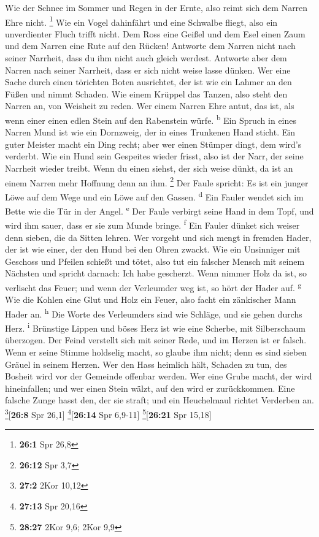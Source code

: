 Wie der Schnee im Sommer und Regen in der Ernte, also
reimt sich dem Narren Ehre nicht. \footnote{\textbf{26:1} Spr 26,8}
 Wie ein Vogel dahinfährt und eine Schwalbe fliegt, also
ein unverdienter Fluch trifft nicht.  Dem Ross eine Geißel
und dem Esel einen Zaum und dem Narren eine Rute auf den Rücken!
 Antworte dem Narren nicht nach seiner Narrheit, dass du
ihm nicht auch gleich werdest.  Antworte aber dem Narren
nach seiner Narrheit, dass er sich nicht weise lasse dünken.
 Wer eine Sache durch einen törichten Boten ausrichtet,
der ist wie ein Lahmer an den Füßen und nimmt Schaden. 
Wie einem Krüppel das Tanzen, also steht den Narren an, von Weisheit zu
reden.  Wer einem Narren Ehre antut, das ist, als wenn
einer einen edlen Stein auf den Rabenstein würfe. \textsuperscript{b}
 Ein Spruch in eines Narren Mund ist wie ein Dornzweig,
der in eines Trunkenen Hand sticht.  Ein guter Meister
macht ein Ding recht; aber wer einen Stümper dingt, dem wird's verderbt.
 Wie ein Hund sein Gespeites wieder frisst, also ist der
Narr, der seine Narrheit wieder treibt.  Wenn du einen
siehst, der sich weise dünkt, da ist an einem Narren mehr Hoffnung denn
an ihm. \footnote{\textbf{26:12} Spr 3,7}  Der Faule
spricht: Es ist ein junger Löwe auf dem Wege und ein Löwe auf den
Gassen. \textsuperscript{d}  Ein Fauler wendet sich im
Bette wie die Tür in der Angel. \textsuperscript{e}  Der
Faule verbirgt seine Hand in dem Topf, und wird ihm sauer, dass er sie
zum Munde bringe. \textsuperscript{f}  Ein Fauler dünket
sich weiser denn sieben, die da Sitten lehren.  Wer
vorgeht und sich mengt in fremden Hader, der ist wie einer, der den Hund
bei den Ohren zwackt.  Wie ein Unsinniger mit Geschoss
und Pfeilen schießt und tötet,  also tut ein falscher
Mensch mit seinem Nächsten und spricht darnach: Ich habe gescherzt.
 Wenn nimmer Holz da ist, so verlischt das Feuer; und
wenn der Verleumder weg ist, so hört der Hader auf. \textsuperscript{g}
 Wie die Kohlen eine Glut und Holz ein Feuer, also facht
ein zänkischer Mann Hader an. \textsuperscript{h}  Die
Worte des Verleumders sind wie Schläge, und sie gehen durchs Herz.
\textsuperscript{i}  Brünstige Lippen und böses Herz ist
wie eine Scherbe, mit Silberschaum überzogen.  Der Feind
verstellt sich mit seiner Rede, und im Herzen ist er falsch.
 Wenn er seine Stimme holdselig macht, so glaube ihm
nicht; denn es sind sieben Gräuel in seinem Herzen.  Wer
den Hass heimlich hält, Schaden zu tun, des Bosheit wird vor der
Gemeinde offenbar werden.  Wer eine Grube macht, der wird
hineinfallen; und wer einen Stein wälzt, auf den wird er zurückkommen.
 Eine falsche Zunge hasst den, der sie straft; und ein
Heuchelmaul richtet Verderben an. \footnote{\textbf{27:2} 2Kor 10,12}{[}\textbf{26:8}
Spr 26,1{]} \footnote{\textbf{27:13} Spr 20,16}{[}\textbf{26:14} Spr
6,9-11{]} \footnote{\textbf{28:27} 2Kor 9,6; 2Kor 9,9}{[}\textbf{26:21}
Spr 15,18{]}

